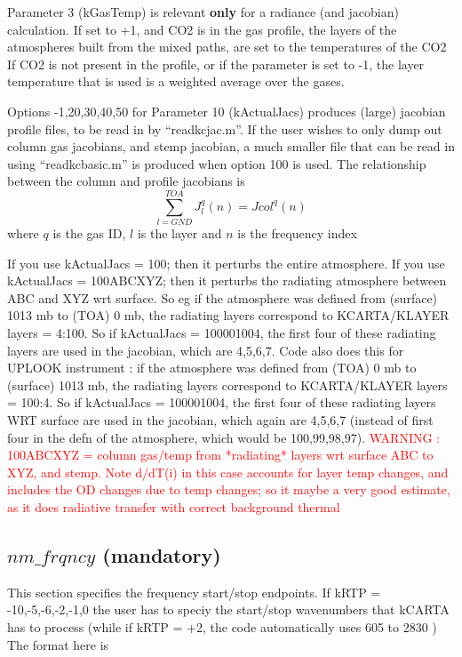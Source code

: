 \documentclass[12pt]{article}
\begin{document}
Parameter 3 ({\sf kGasTemp}) is relevant {\bf only} for a radiance
(and jacobian) calculation.  If set to +1, and CO2 is in the gas
profile, the layers of the atmospheres built from the mixed paths, are
set to the temperatures of the CO2 If CO2 is not present in the
profile, or if the parameter is set to -1, the layer temperature that
is used is a weighted average over the gases.

Options -1,20,30,40,50 for Parameter 10 ({\sf kActualJacs}) produces (large) 
jacobian profile files, to be read in by ``readkcjac.m''. If the user wishes 
to only dump out column gas jacobians, and stemp jacobian, a much smaller 
file that can be read in using ``readkcbasic.m'' is produced when option 100
is used. The relationship between the column and profile jacobians is
\[
\displaystyle\sum_{l=GND}^{TOA} J^{q}_{l}(n) = Jcol^{q}(n)
\]
where $q$ is the  gas ID, $l$ is the layer and $n$ is the frequency index

If you use {\sf kActualJacs} = 100; then it perturbs the entire atmosphere.
If you use {\sf kActualJacs} = 100ABCXYZ; then it perturbs the radiating 
atmosphere between ABC and XYZ wrt surface. So eg if the atmosphere was 
defined from 
(surface) 1013 mb to (TOA) 0 mb, the radiating layers correspond to 
KCARTA/KLAYER layers = 4:100. So if {\sf kActualJacs} = 100001004, the first 
four of these radiating layers are used in the jacobian, which are 4,5,6,7.
Code also does this for UPLOOK instrument : if the atmosphere was defined from 
(TOA) 0 mb to (surface) 1013 mb, the radiating layers correspond to 
KCARTA/KLAYER layers = 100:4. So if {\sf kActualJacs} = 100001004, the first 
four of these radiating layers WRT surface are used in the jacobian, 
which again are 4,5,6,7 (instead of first four in the defn of the atmosphere, 
which would be 100,99,98,97).
\textcolor{red}{WARNING : 100ABCXYZ = column gas/temp from *radiating* layers 
wrt surface ABC to XYZ, and stemp. Note d/dT(i) in this case accounts for 
layer temp changes, and includes the OD changes due to temp changes; 
so it maybe a very good estimate, as it does radiative transfer
with correct background thermal}

\subsection{$nm\_frqncy$ (mandatory)}

This section specifies the frequency start/stop endpoints.  If kRTP = -10,-5,-6,-2,-1,0 
the user has to speciy the start/stop wavenumbers that kCARTA has to process (while
if kRTP = +2, the code automatically uses 605 to 2830 \wn)
The format here is
\end{document}
